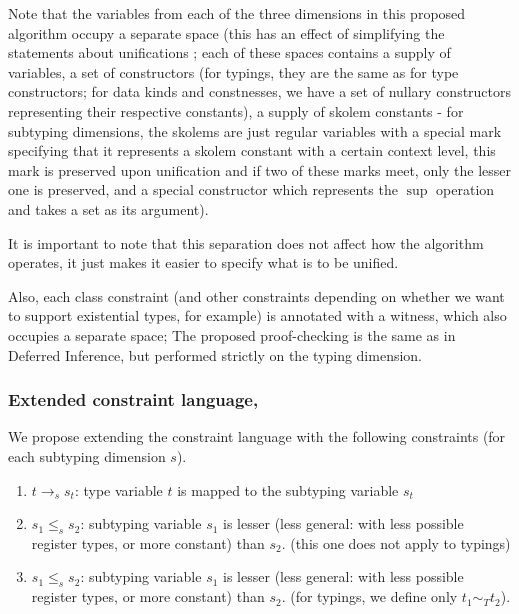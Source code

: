 Note that the variables from each of the three dimensions in this proposed algorithm occupy a separate space (this has an effect of simplifying the statements about unifications ; each of these spaces contains a supply of variables, a set of constructors (for typings, they are the same as for type constructors; for data kinds and constnesses, we have a set of nullary constructors representing their respective constants), a supply of skolem constants - for subtyping dimensions, the skolems are just regular variables with a special mark specifying that it represents a skolem constant with a certain context level, this mark is preserved upon unification and if two of these marks meet, only the lesser one is preserved, and a special constructor which represents the $\sup$ operation and takes a set as its argument).

\begin{remark}
    It is important to note that this separation does not affect how the algorithm operates, it just makes it easier to specify what is to be unified.
\end{remark}

Also, each class constraint (and other constraints depending on whether we want to support existential types, for example) is annotated with a witness, which also occupies a separate space; The proposed proof-checking is the same as in Deferred Inference, but performed strictly on the typing dimension.

\subsubsection{Extended constraint language, }

We propose extending the constraint language with the following constraints (for each subtyping dimension $s$).

\begin{enumerate}
    \item $t \to_s s_t$: type variable $t$ is mapped to the subtyping variable $s_t$

    \item $s_1 \leq_s s_2$: subtyping variable $s_1$ is lesser (less general: with less possible register types, or more constant) than $s_2$. (this one does not apply to typings)

    \item $s_1 \leq_s s_2$: subtyping variable $s_1$ is lesser (less general: with less possible register types, or more constant) than $s_2$. (for typings, we define only $t_1 \sim_T t_2$).
\end{enumerate}

